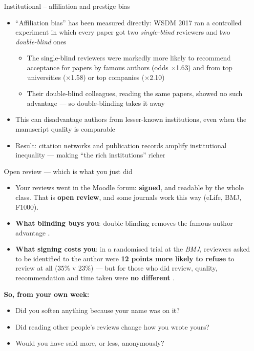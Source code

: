 \documentclass[aspectratio=169]{beamer}
\begin{document}
\begin{frame}{Institutional – affiliation and prestige bias}
\begin{itemize}
\item ``Affiliation bias'' has been measured directly: WSDM 2017 ran a controlled experiment in which every paper got two \emph{single-blind} reviewers and two \emph{double-blind} ones \citep{tomkins2017dblblind}
    \begin{itemize}
    \item The single-blind reviewers were markedly more likely to recommend acceptance for papers by famous authors (odds $\times$1.63) and from top universities ($\times$1.58) or top companies ($\times$2.10)
    \item Their double-blind colleagues, reading the same papers, showed no such advantage --- so double-blinding takes it away
    \end{itemize}
  \item This can disadvantage authors from lesser-known institutions, even when the manuscript quality is comparable
  \item Result: citation networks and publication records amplify institutional inequality — making ``the rich institutions'' richer
\end{itemize}
\end{frame}

\begin{frame}{Open review --- which is what you just did}
\begin{itemize}
  \item Your reviews went in the Moodle forum: \textbf{signed}, and readable by
    the whole class.  That is \textbf{open review}, and some journals work this
    way (eLife, BMJ, F1000).
  \item \textbf{What blinding buys you}: double-blinding removes the famous-author
    advantage \citep{tomkins2017dblblind}.
  \item \textbf{What signing costs you}: in a randomised trial at the
    \emph{BMJ}, reviewers asked to be identified to the author were
    \textbf{12 points more likely to refuse} to review at all (35\% v 23\%) ---
    but for those who did review, quality, recommendation and time taken were
    \textbf{no different} \citep{vanrooyen1999open}.
\end{itemize}
\vspace{1ex}
\textbf{So, from your own week:}
\begin{itemize}
  \item Did you soften anything because your name was on it?
  \item Did reading other people's reviews change how you wrote yours?
  \item Would you have said more, or less, anonymously?
\end{itemize}
\end{frame}
\end{document}
